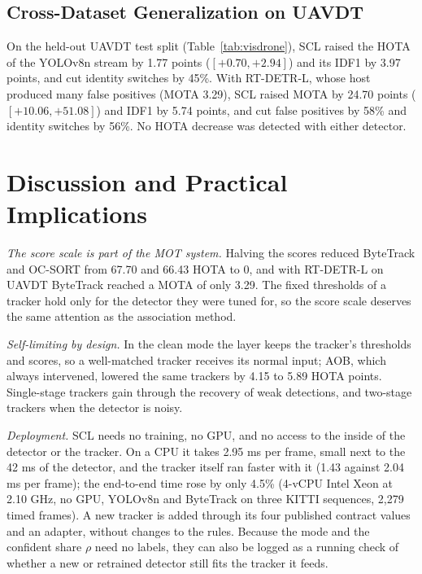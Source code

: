\documentclass[pdflatex,sn-mathphys-num,iicol]{sn-jnl}
\newcommand{\scl}{SCL}
\newcommand{\aob}{AOB}
\begin{document}
\subsection{Cross-Dataset Generalization on UAVDT}\label{sec:visdrone}
On the held-out UAVDT test split (Table~\ref{tab:visdrone}), \scl{} raised the HOTA of the YOLOv8n
stream by 1.77 points ($[+0.70,+2.94]$) and its IDF1 by 3.97 points, and cut identity switches by
45\%. With RT-DETR-L, whose host produced many false positives (MOTA 3.29), \scl{} raised MOTA by
24.70 points ($[+10.06,+51.08]$) and IDF1 by 5.74 points, and cut false positives by 58\% and
identity switches by 56\%. No HOTA decrease was detected with either detector.
\section{Discussion and Practical Implications}\label{sec:discussion}

\emph{The score scale is part of the MOT system.} Halving the scores reduced ByteTrack and OC-SORT
from 67.70 and 66.43 HOTA to 0, and with RT-DETR-L on UAVDT ByteTrack reached a MOTA of only 3.29.
The fixed thresholds of a tracker hold only for the detector they were tuned for, so the score
scale deserves the same attention as the association method.

\emph{Self-limiting by design.} In the clean mode the layer keeps the tracker's thresholds and
scores, so a well-matched tracker receives its normal input; \aob{}, which always intervened,
lowered the same trackers by 4.15 to 5.89 HOTA points. Single-stage trackers gain through the
recovery of weak detections, and two-stage trackers when the detector is noisy.

\emph{Deployment.} \scl{} needs no training, no GPU, and no access to the inside of the detector or
the tracker. On a CPU it takes 2.95 ms per frame, small next to the 42 ms of the detector, and the
tracker itself ran faster with it (1.43 against 2.04 ms per frame); the end-to-end time rose by
only 4.5\% (4-vCPU Intel Xeon at 2.10 GHz, no GPU, YOLOv8n and ByteTrack on three KITTI sequences,
2,279 timed frames). A new tracker is added through its four published contract
values and an adapter, without changes to the rules. Because the mode and the confident share
$\rho$ need no labels, they can also be logged as a running check of whether a new or retrained
detector still fits the tracker it feeds.
\end{document}
